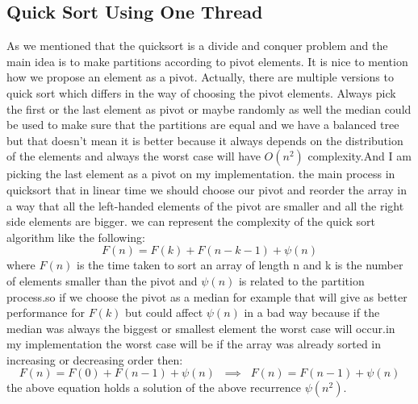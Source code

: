 \documentclass[preprint,pre,floats,aps,amsmath,amssymb]{revtex4}
\begin{document}
\subsection{Quick Sort Using One Thread}
As we mentioned that the quicksort is a divide and conquer problem and the main idea is to make partitions according to pivot elements. It is nice to mention how we propose an element as a pivot. Actually, there are multiple versions to quick sort which differs in the way of choosing the pivot elements. Always pick the first or the last element as pivot or maybe randomly as well the median could be used to make sure that the partitions are equal and we have a balanced tree but that doesn't mean it is better because it always depends on the distribution of the elements and always the worst case will have $O(n^2)$ complexity.And I am picking the last element as a pivot on my implementation. 
the main process in quicksort that in linear time we should choose our pivot and reorder the array in a way that all the left-handed elements of the pivot are smaller and all the right side elements are bigger.
we can represent the complexity of the quick sort algorithm like the following:
$$ F(n) = F(k) + F(n-k-1)+\psi(n) $$
where $F(n)$ is the time taken to sort an array of length n and k is the number of elements smaller than the pivot and $\psi(n)$  is related to the partition process.so if we choose the pivot as a median for example that will give as better performance for $F(k)$ but could affect $\psi(n)$ in a bad way because if the median was always the biggest or smallest element the worst case will occur.in my implementation the worst case will be if the array was already sorted in increasing or decreasing order then:
$$ F(n) = F(0) + F(n-1) +\psi(n)\;\; \implies \;\; F(n)=F(n-1)+\psi(n)$$
the above equation holds a solution of the above recurrence $\psi(n^2)$.
 
\end{document}
